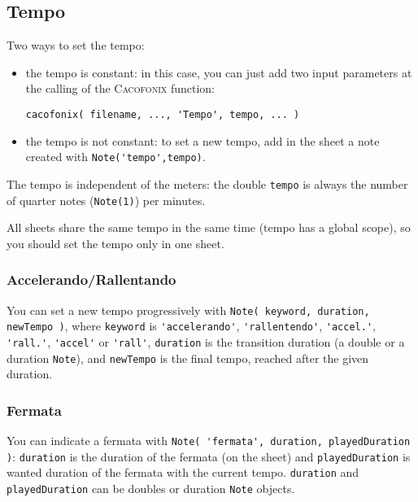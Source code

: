 \documentclass{article}
\newcommand{\cacofonix}{\textsc{Cacofonix}\xspace}
\newcommand{\note}{\lstinline!Note!\xspace}
\begin{document}
\subsection{Tempo}
\label{sec:Tempo}

Two ways to set the tempo:
\begin{itemize}
	\item the tempo is constant: in this case, you can just add two input parameters at the calling of the \cacofonix function:
\begin{lstlisting}
cacofonix( filename, ..., 'Tempo', tempo, ... )
\end{lstlisting}
	\item the tempo is not constant: to set a new tempo, add in the sheet a note created with \lstinline!Note('tempo',tempo)!.
\end{itemize}

The tempo is independent of the meters: the double \lstinline!tempo! is always the number of quarter notes (\lstinline!Note(1)!) per minutes.

All sheets share the same tempo in the same time (tempo has a global scope), so you should set the tempo only in one sheet.

\subsubsection{Accelerando/Rallentando}
\label{sec:AccelerandoRallentando}

You can set a new tempo progressively with \lstinline!Note( keyword, duration, newTempo )!, where \lstinline!keyword! is \lstinline!'accelerando'!, \lstinline!'rallentendo'!, \lstinline!'accel.'!, \lstinline!'rall.'!, \lstinline!'accel'! or \lstinline!'rall'!, \lstinline!duration! is the transition duration (a double or a duration \note), and \lstinline!newTempo! is the final tempo, reached after the given duration.

\subsubsection{Fermata}
\label{sec:Fermata}

You can indicate a fermata with \lstinline!Note( 'fermata', duration, playedDuration )!: \lstinline!duration! is the duration of the fermata (on the sheet) and \lstinline!playedDuration! is wanted duration of the fermata with the current tempo. \lstinline!duration! and \lstinline!playedDuration! can be doubles or duration \note objects.
\end{document}

